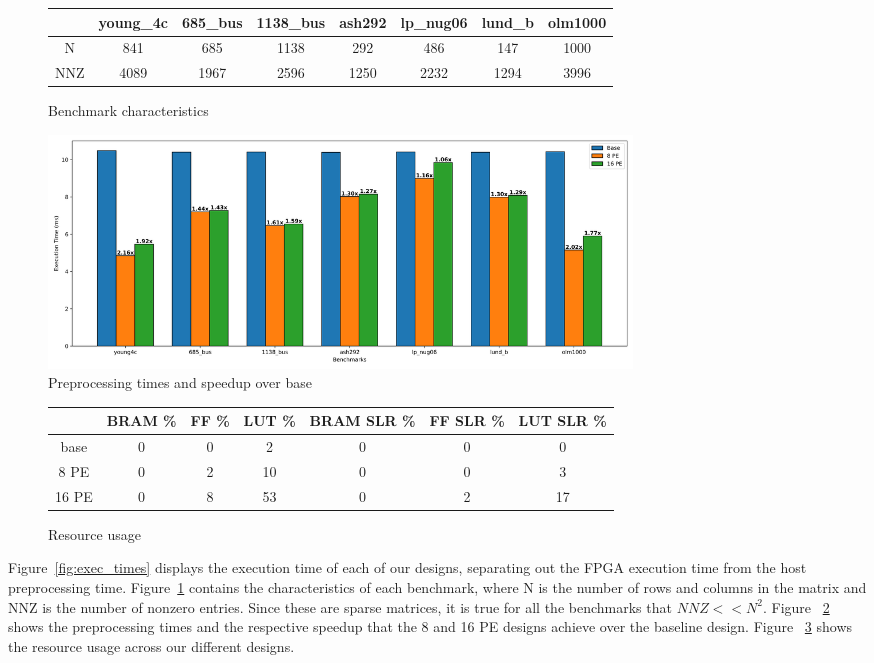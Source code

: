 \documentclass[10pt]{article}
\begin{document}
\begin{figure}[h!]
  \centering
  \begin{tabular} {| c | c | c | c | c | c | c | c |}
    \hline
         & young\_4c & 685\_bus & 1138\_bus & ash292 & lp\_nug06 & lund\_b & olm1000 \\
    \hline
    N    & 841       & 685      & 1138      & 292    & 486       & 147     & 1000 \\
    \hline
    NNZ  & 4089      & 1967     &  2596     & 1250   & 2232      & 1294    & 3996 \\
    \hline
  \end{tabular}
  \caption{Benchmark characteristics}
  \label{fig:bench_info}
\end{figure}

\begin{figure}[h!]
  \centering
  \includegraphics[width=0.75\textwidth]{speedup.png}
  \caption{Preprocessing times and speedup over base}
  \label{fig:speedups}
\end{figure}

\begin{figure}[h!]
  \centering
  \begin{tabular} {| c | c | c | c | c | c | c |}
    \hline
          & BRAM \% & FF \% & LUT \% & BRAM SLR \% & FF SLR \% & LUT SLR \% \\
    \hline
    base  & 0 & 0 & 2 & 0 & 0 & 0 \\
    \hline
    8 PE  & 0 & 2 & 10 & 0 & 0 & 3 \\
    \hline
    16 PE & 0 & 8 & 53 & 0 & 2 & 17 \\
    \hline
  \end{tabular}
  \caption{Resource usage}
  \label{fig:resources}
\end{figure}

\noindent Figure~\ref{fig:exec_times} displays the execution time of each of our designs, separating out the FPGA execution time from
the host preprocessing time. Figure~\ref{fig:bench_info} contains the characteristics of each benchmark, where N is the number of
rows and columns in the matrix and NNZ is the number of nonzero entries. Since these are sparse matrices, it is true for all the
benchmarks that $\mathit{NNZ} << N^2$. Figure ~\ref{fig:speedups} shows the preprocessing times and the respective speedup that the 8 and 
16 PE designs achieve over the baseline design. Figure ~\ref{fig:resources} shows the resource usage across our different designs.\newline
\end{document}

